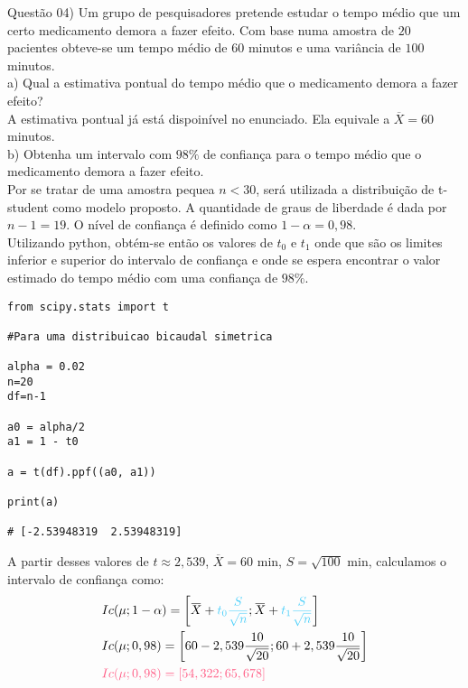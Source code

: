 
\noindent \textcolor{COLOR1}{Questão 04)} Um grupo de pesquisadores pretende estudar o tempo médio que um certo medicamento demora a fazer efeito. Com base numa amostra de $20$ pacientes obteve-se um tempo médio de $60$ minutos e uma variância de $100$ minutos.
\\

a) Qual a estimativa pontual do tempo médio que o medicamento demora a fazer efeito?
\\

A estimativa pontual já está dispoinível no enunciado. Ela equivale a \textcolor{COLOR2}{$\overbar{X}=60$ minutos}.
\\

b) Obtenha um intervalo com $98\%$ de confiança para o tempo médio que o medicamento demora a fazer efeito.
\\

Por se tratar de uma amostra pequea $n<30$, será utilizada a distribuição de t-student como modelo proposto. A quantidade de graus de liberdade é dada por $n-1=19$. O nível de confiança é definido como $1-\alpha = 0,98$.\\

Utilizando python, obtém-se então os valores de $t_0$ e $t_1$ onde que são os limites inferior e superior do intervalo de confiança e onde se espera encontrar o valor estimado do tempo médio com uma confiança de $98\%$.\\

\begin{lstlisting}
from scipy.stats import t

#Para uma distribuicao bicaudal simetrica

alpha = 0.02
n=20
df=n-1
    
a0 = alpha/2
a1 = 1 - t0
    
a = t(df).ppf((a0, a1))
    
print(a)
    
# [-2.53948319  2.53948319]
\end{lstlisting}

A partir desses valores de $t\approx2,539$, $\overbar{X}=60$ min, $S=\sqrt{100}$ min, calculamos o intervalo de confiança como:\\

\[
    \begin{split}
        &Ic(\mu; 1-\alpha) = \biggl[\overbar{X}+\textcolor{deepblue}{t_0\frac{S}{\sqrt{n}}};\overbar{X}+\textcolor{deepblue}{t_1\frac{S}{\sqrt{n}}}\biggr]\\
        &Ic(\mu; 0,98) = \biggl[60-2,539\frac{10}{\sqrt{20}};60+2,539\frac{10}{\sqrt{20}}\biggr]\\
        &\textcolor{COLOR2}{Ic(\mu; 0,98) = [54,322;65,678]}
    \end{split}
\]
\\

